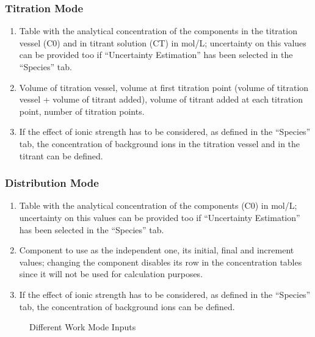 \documentclass[a4paper, 12pt]{article}
\newcommand*\circled[1]{\kern-2.5em%
  \put(0,4){\color{red}\circle*{18}}\put(0,4){\circle{16}}%
  \put(-4,0){\color{white}\bfseries\large#1}~~}
\begin{document}
\subsubsection{Titration Mode}
\begin{enumerate}[label=\protect\circled{\arabic*}]
    \item Table with the analytical concentration of the components in the titration vessel (C0) and in titrant solution (CT) in \unit{\mol / \liter}; uncertainty on this values can be provided too if ``Uncertainty Estimation'' has been selected in the ``Species'' tab.
    \item Volume of titration vessel, volume at first titration point (volume of titration vessel + volume of titrant added), volume of titrant added at each titration point, number of titration points.
    \item If the effect of ionic strength has to be considered, as defined in the ``Species'' tab, the concentration of background ions in the titration vessel and in the titrant can be defined.
\end{enumerate}

\subsubsection{Distribution Mode}
\begin{enumerate}[label=\protect\circled{\arabic*}]
    \item Table with the analytical concentration of the components (C0) in \unit{\mol / \liter}; uncertainty on this values can be provided too if ``Uncertainty Estimation'' has been selected in the ``Species'' tab.
    \item Component to use as the independent one, its initial, final and increment values; changing the component disables its row in the concentration tables since it will not be used for calculation purposes.
    \item If the effect of ionic strength has to be considered, as defined in the ``Species'' tab, the concentration of background ions can be defined.
\end{enumerate}

\begin{figure}[h]%
    \centering
    \qquad
    \caption{Different Work Mode Inputs}%
    \label{fig:work_inputs}%
\end{figure}
\end{document}
